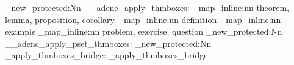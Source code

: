 \makeatletter
\renewenvironment{proof}[1][\proofname]{%
    \ifx#1\proofname
        \begin{replacementproof}%
    \else
        \begin{replacementproof}[#1]%
    \fi
}{\end{replacementproof}}
\makeatother


\ExplSyntaxOn
\cs_new_protected:Nn \__adenc_apply_thmboxes:
{
  \clist_map_inline:nn {theorem, lemma, proposition, corollary}
  {
  }
  \clist_map_inline:nn {definition}
  {
  }
  \clist_map_inline:nn {example}
  {
  }
  \clist_map_inline:nn {problem, exercise, question}
  {
  }
}
\cs_new_protected:Nn \__adenc_apply_pset_thmboxes:
{
}
\cs_new_protected:Nn \adenc_apply_thmboxes_bridge:
{
   {  { } }
}
\adenc_apply_thmboxes_bridge:
\ExplSyntaxOff
